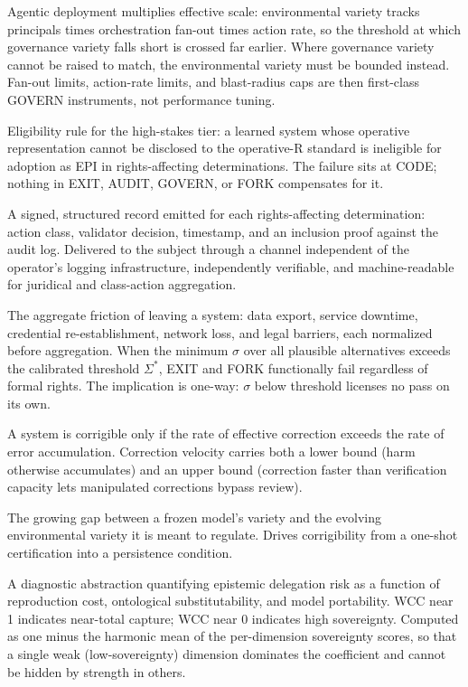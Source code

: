 \begin{description}[style=nextline, leftmargin=1.5em, font=\normalfont\bfseries]
Agentic deployment multiplies effective scale: environmental variety
tracks principals times orchestration fan-out times action rate, so the
threshold at which governance variety falls short is crossed far
earlier. Where governance variety cannot be raised to match, the
environmental variety must be bounded instead. Fan-out limits,
action-rate limits, and blast-radius caps are then first-class GOVERN
instruments, not performance tuning.

Eligibility rule for the high-stakes tier: a learned system whose
operative representation cannot be disclosed to the operative-R
standard is ineligible for adoption as EPI in rights-affecting
determinations. The failure sits at CODE; nothing in EXIT, AUDIT,
GOVERN, or FORK compensates for it.

A signed, structured record emitted for each rights-affecting
determination: action class, validator decision, timestamp, and an
inclusion proof against the audit log. Delivered to the subject through
a channel independent of the operator's logging infrastructure,
independently verifiable, and machine-readable for juridical and
class-action aggregation.

The aggregate friction of leaving a system: data export, service
downtime, credential re-establishment, network loss, and legal
barriers, each normalized before aggregation. When the minimum
$\sigma$ over all plausible alternatives exceeds the calibrated
threshold $\Sigma^*$, EXIT and FORK functionally fail regardless of
formal rights. The implication is one-way: $\sigma$ below threshold
licenses no pass on its own.

A system is corrigible only if the rate of effective correction
exceeds the rate of error accumulation. Correction velocity carries
both a lower bound (harm otherwise accumulates) and an upper bound
(correction faster than verification capacity lets manipulated
corrections bypass review).

The growing gap between a frozen model's variety and the evolving
environmental variety it is meant to regulate. Drives corrigibility
from a one-shot certification into a persistence condition.

A diagnostic abstraction quantifying epistemic delegation risk as a
function of reproduction cost, ontological substitutability, and model
portability. WCC near 1 indicates near-total capture; WCC near 0
indicates high sovereignty. Computed as one minus the harmonic mean
of the per-dimension sovereignty scores, so that a single weak
(low-sovereignty) dimension dominates the coefficient and cannot be
hidden by strength in others.

\end{description}
